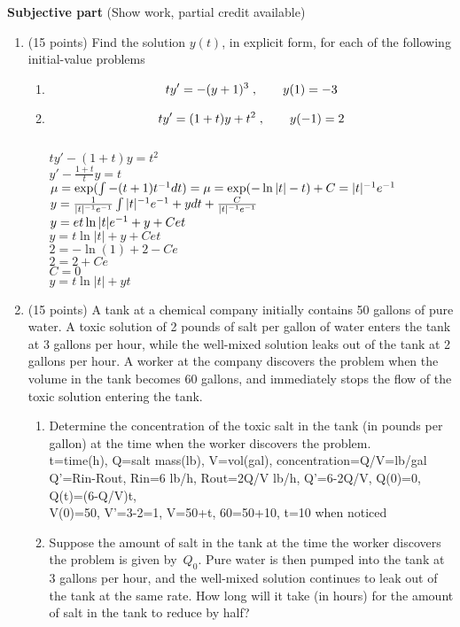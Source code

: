 \documentclass{article}
\begin{document}
\bigskip\noindent
{\bf Subjective part} (Show work, partial credit available)

\begin{enumerate}

\item (15 points)  Find the solution $y(t)$, in explicit form, for each of the following initial-value problems
\begin{enumerate}
\item
\[
ty\sp\prime=-(y+1)\sp3\;,\qquad y(1)=-3
\]
\item
\[
ty\sp\prime=(1+t)y+t\sp2\;,\qquad y(-1)=2
\]
\\$ty'-(1+t)y=t^2$
\\$y'-\frac{1+t}{t}y=t$
\\$\mu=\exp(\int-(t+1)t\sp{-1}dt)=\mu=\exp(-\ln|t|-t)+C=|t|\sp{-1}e\sp{-1}$
\\$y=\frac{1}{|t|\sp{-1}e\sp{-1}}\int |t|\sp{-1}e\sp{-1}+y dt+\frac{C}{|t|\sp{-1}e\sp{-1}}$
\\$y=et\ln|t|e\sp{-1}+y+Cet$
\\$y=t\ln |t|+y+Cet$
\\$2=-\ln(1)+2-Ce$
\\$2=2+Ce$
\\$C=0$
\\$y=t\ln |t|+yt$

\end{enumerate}


\bigskip
\item (15 points) A tank at a chemical company initially contains 50 gallons of pure water.  A toxic solution of 2 pounds of salt per gallon of water enters the tank at 3 gallons per hour, while the well-mixed solution leaks out of the tank at 2 gallons per hour.  A worker at the company discovers the problem when the volume in the tank becomes 60 gallons, and immediately stops the flow of the toxic solution entering the tank.
\begin{enumerate}
\item Determine the concentration of the toxic salt in the tank (in pounds per gallon) at the time when the worker discovers the problem.
\\t=time(h), Q=salt mass(lb), V=vol(gal), concentration=Q/V=lb/gal
\\Q'=Rin-Rout, Rin=6 lb/h, Rout=2Q/V lb/h, Q'=6-2Q/V, Q(0)=0, Q(t)=(6-Q/V)t, 
\\V(0)=50, V'=3-2=1, V=50+t, 60=50+10, t=10 when noticed

\item Suppose the amount of salt in the tank at the time the worker discovers the problem is given by~$Q_0$.  Pure water is then pumped into the tank at 3 gallons per hour, and the well-mixed solution continues to leak out of the tank at the same rate.  How long will it take (in hours) for the amount of salt in the tank to reduce by half?
\end{enumerate}


\end{enumerate}
\end{document}
